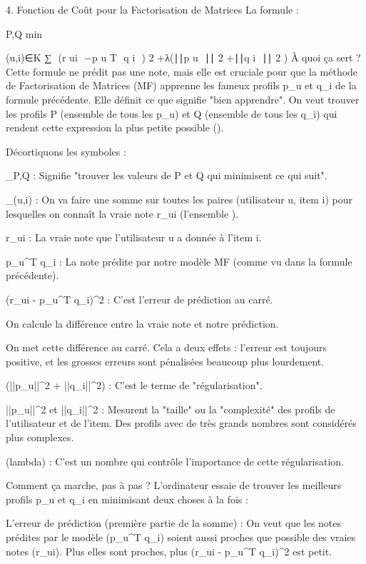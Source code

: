 4. Fonction de Coût pour la Factorisation de Matrices
La formule :


P,Q
min
​
  
(u,i)∈K
∑
​
 (r 
ui
​
 −p 
u
T
​
 q 
i
​
 ) 
2
 +λ(∣∣p 
u
​
 ∣∣ 
2
 +∣∣q 
i
​
 ∣∣ 
2
 )
À quoi ça sert ?
Cette formule ne prédit pas une note, mais elle est cruciale pour que la méthode de Factorisation de Matrices (MF) apprenne les fameux profils p_u et q_i de la formule précédente. Elle définit ce que signifie "bien apprendre". On veut trouver les profils P (ensemble de tous les p_u) et Q (ensemble de tous les q_i) qui rendent cette expression la plus petite possible (\min).

Décortiquons les symboles :

\min_{P,Q} : Signifie "trouver les valeurs de P et Q qui minimisent ce qui suit".

\sum_{(u,i) \in {}} : On va faire une somme sur toutes les paires (utilisateur u, item i) pour lesquelles on connaît la vraie note r_{ui} (l'ensemble ).

r_{ui} : La vraie note que l'utilisateur u a donnée à l'item i.

p_u^T q_i : La note prédite par notre modèle MF (comme vu dans la formule précédente).

(r_{ui} - p_u^T q_i)^2 : C'est l'erreur de prédiction au carré.

On calcule la différence entre la vraie note et notre prédiction.

On met cette différence au carré. Cela a deux effets : l'erreur est toujours positive, et les grosses erreurs sont pénalisées beaucoup plus lourdement.

\lambda (||p_u||^2 + ||q_i||^2) : C'est le terme de "régularisation".

||p_u||^2 et ||q_i||^2 : Mesurent la "taille" ou la "complexité" des profils de l'utilisateur et de l'item. Des profils avec de très grands nombres sont considérés plus complexes.

\lambda (lambda) : C'est un nombre qui contrôle l'importance de cette régularisation.

Comment ça marche, pas à pas ?
L'ordinateur essaie de trouver les meilleurs profils p_u et q_i en minimisant deux choses à la fois :

L'erreur de prédiction (première partie de la somme) : On veut que les notes prédites par le modèle (p_u^T q_i) soient aussi proches que possible des vraies notes (r_{ui}). Plus elles sont proches, plus (r_{ui} - p_u^T q_i)^2 est petit.

